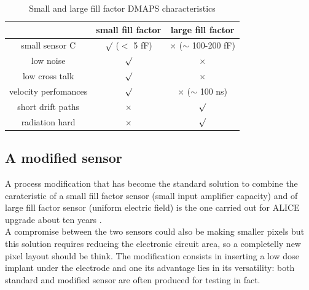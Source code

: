       \begin{table}
         \begin{center}
         \begin{tabular}{|c | c |c |}
         \hline
         & small fill factor & large fill factor\\
         \hline
         \hline
         small sensor C & $\surd$ ($<$ 5 fF) & $\times$ ($\sim$ 100-200 fF)\\
         low noise & $\surd$ & $\times$\\
         low cross talk & $\surd$ & $\times$ \\
         velocity perfomances & $\surd$ & $\times$ ($\sim$ 100 ns)\\
         short drift paths & $\times$ & $\surd$ \\
         radiation hard & $\times$ & $\surd$ \\
         \hline
         \end{tabular}
         \caption{Small and large fill factor DMAPS characteristics}
         \label{tab:DMAPS_large_small_fillfactor}
         \end{center}
      \end{table}

   \subsection{A modified sensor}
      A process modification that has become the standard solution to combine the carateristic of a small fill factor sensor (small input amplifier capacity) and of large fill factor sensor (uniform electric field) is the one carried out for ALICE upgrade about ten years \cite{AProcessModification}.\\
      A compromise between the two sensors could also be making smaller pixels but this solution requires reducing the electronic circuit area, so a completelly new pixel layout should be think. The modification consists in inserting a low dose implant under the electrode and one its advantage lies in its versatility: both standard and modified sensor are often produced for testing in fact.

